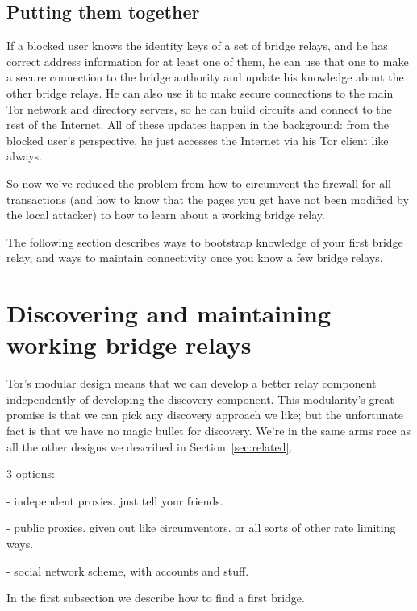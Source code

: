 \documentclass{llncs}
\begin{document}
\subsection{Putting them together}

If a blocked user knows the identity keys of a set of bridge relays, and
he has correct address information for at least one of them, he can use
that one to make a secure connection to the bridge authority and update
his knowledge about the other bridge relays. He can also use it to make
secure connections to the main Tor network and directory servers, so he
can build circuits and connect to the rest of the Internet. All of these
updates happen in the background: from the blocked user's perspective,
he just accesses the Internet via his Tor client like always.

So now we've reduced the problem from how to circumvent the firewall
for all transactions (and how to know that the pages you get have not
been modified by the local attacker) to how to learn about a working
bridge relay.

The following section describes ways to bootstrap knowledge of your first
bridge relay, and ways to maintain connectivity once you know a few
bridge relays.

\section{Discovering and maintaining working bridge relays}
\label{sec:discovery}

Tor's modular design means that we can develop a better relay component
independently of developing the discovery component. This modularity's
great promise is that we can pick any discovery approach we like; but the
unfortunate fact is that we have no magic bullet for discovery. We're
in the same arms race as all the other designs we described in
Section~\ref{sec:related}.

3 options:

- independent proxies. just tell your friends.

- public proxies. given out like circumventors. or all sorts of other rate limiting ways.

- social network scheme, with accounts and stuff.



In the first subsection we describe how to find a first bridge.
\end{document}
